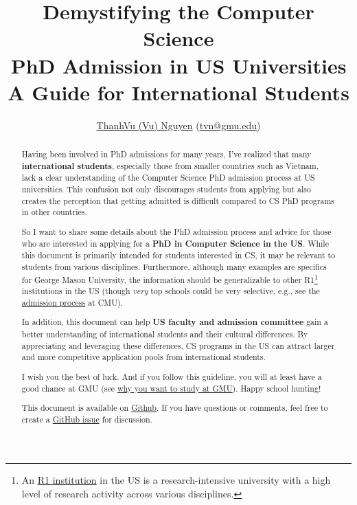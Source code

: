 \documentclass[11pt]{article}
\title{\vspace{-1in} Demystifying the Computer Science \\PhD Admission in US Universities\\{\large A Guide for International Students}}
\author{\small \href{https://nguyenthanhvuh.github.io}{ThanhVu (Vu) Nguyen} (\href{mailto:tvn@gmu.edu}{tvn@gmu.edu})}
\begin{document}
\maketitle

\begin{abstract}
Having been involved in PhD admissions for many years, I've
realized that many \textbf{international students}, especially those from smaller countries such as Vietnam, lack a clear understanding of
the Computer Science PhD admission process at US universities. This confusion not only
discourages students from applying but also creates the perception that
getting admitted is difficult compared to CS PhD programs in other countries.

So I want to share some details about the PhD admission process and advice for those who are interested in applying for a \textbf{PhD in Computer Science in the US}.
While this document is primarily intended for students interested in CS, it may be relevant to students from various disciplines.
Furthermore, although many examples are specifics for George Mason University, the information should be generalizable to other R1\footnote{An \href{https://en.wikipedia.org/wiki/List_of_research_universities_in_the_United_States}{R1 institution} in the US is a research-intensive university with a high level of research activity across various disciplines.} institutions in the US  (though \emph{very} top schools could be very selective, e.g., see the \href{https://da-data.blogspot.com/2015/03/reflecting-on-cs-graduate-admissions.html}{admission process} at CMU).

In addition, this document can help \textbf{US faculty and admission committee} gain a better understanding of international students and their cultural differences.  By appreciating and leveraging these differences, CS programs in the US can attract larger and more competitive application pools from international students.

I wish you the best of luck. And if you follow this guideline,
you will at least have a good chance at GMU (see
\href{https://github.com/dynaroars/dynaroars.github.io/wiki/About-GMU}{why
you want to study at GMU}). Happy school hunting!

This document is available on \href{https://github.com/nguyenthanhvuh/phd-cs-us}{Github}. If you have questions or comments, feel free to create a \href{https://github.com/nguyenthanhvuh/phd-cs-us/issues}{GitHub issue} for discussion.
\end{abstract}
\end{document}
